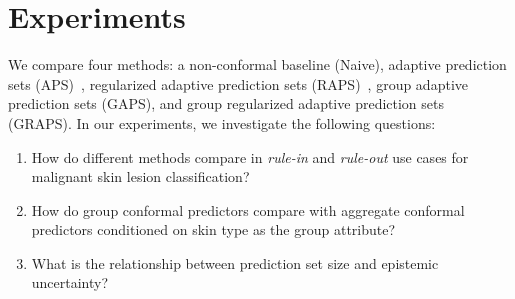 \documentclass[letterpaper]{article} %
\begin{document}
     
    
\section{Experiments}
    We compare four methods: a non-conformal baseline (Naive), adaptive prediction sets (APS)~\cite{NEURIPS2020_244edd7e}, regularized adaptive prediction sets (RAPS)~\cite{angelopoulos2021uncertainty}, group adaptive prediction sets (GAPS), and group regularized adaptive prediction sets (GRAPS).
    In our experiments, we investigate the following questions:
    \begin{enumerate}
        \item How do different methods compare in \textit{rule-in} and \textit{rule-out} use cases for malignant skin lesion classification? 
        \item How do group conformal predictors compare with aggregate conformal predictors conditioned on skin type as the group attribute?
        \item What is the relationship between prediction set size and epistemic uncertainty?
    \end{enumerate}
    
\end{document}
